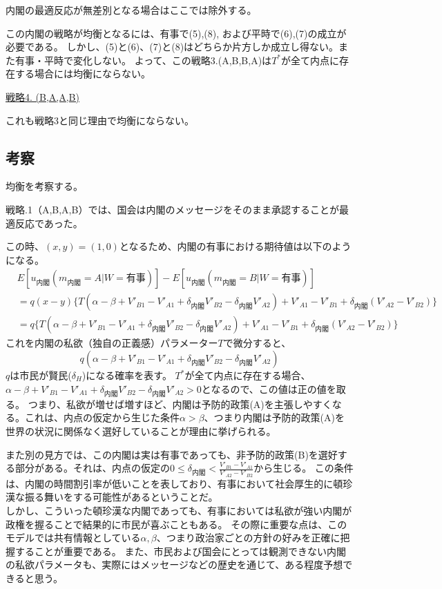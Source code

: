 \documentclass[main.tex]{subfiles}
\begin{document}
内閣の最適反応が無差別となる場合はここでは除外する。

この内閣の戦略が均衡となるには、有事で(5),(8), および平時で(6),(7)の成立が必要である。
しかし、(5)と(6)、(7)と(8)はどちらか片方しか成立し得ない。また有事・平時で変化しない。
よって、この戦略3.(A,B,B,A)は$T^*$が全て内点に存在する場合には均衡にならない。


\noindent
\underline{戦略4. (B,A,A,B)}

これも戦略3と同じ理由で均衡にならない。


\subsection{考察}
均衡を考察する。

戦略.1（A,B,A,B）では、国会は内閣のメッセージをそのまま承認することが最適反応であった。


この時、$(x, y) = (1,0)$となるため、内閣の有事における期待値は以下のようになる。
\begin{align*}
    &E[u_{内閣}(m_{内閣}=A|W=有事)] - E[u_{内閣}(m_{内閣}=B|W=有事)] \\
    &= q(x-y) \lbrace T(\alpha-\beta + V'_{B1}-V'_{A1} + \delta_{内閣}V'_{B2} - \delta_{内閣}V'_{A2}) + V'_{A1} - V'_{B1} + \delta_{内閣}(V'_{A2} - V'_{B2})  \rbrace\\
    &= q \lbrace T(\alpha-\beta + V'_{B1}-V'_{A1} + \delta_{内閣}V'_{B2} - \delta_{内閣}V'_{A2}) + V'_{A1} - V'_{B1} + \delta_{内閣}(V'_{A2} - V'_{B2})  \rbrace 
\end{align*}
これを内閣の私欲（独自の正義感）パラメーター$T$で微分すると、
$$ q(\alpha-\beta + V'_{B1}-V'_{A1} + \delta_{内閣}V'_{B2} - \delta_{内閣}V'_{A2}) $$
$q$は市民が賢民($\delta_H$)になる確率を表す。
$T^*$が全て内点に存在する場合、$\alpha-\beta + V'_{B1}-V'_{A1} + \delta_{内閣}V'_{B2} - \delta_{内閣}V'_{A2}>0$となるので、この値は正の値を取る。
つまり、私欲が増せば増すほど、内閣は予防的政策(A)を主張しやすくなる。これは、内点の仮定から生じた条件$\alpha>\beta$、つまり内閣は予防的政策(A)を世界の状況に関係なく選好していることが理由に挙げられる。

また別の見方では、この内閣は実は有事であっても、非予防的政策(B)を選好する部分がある。それは、内点の仮定の$0\le \delta_{内閣} < \frac{V'_{B1} - V'_{A1}}{V'_{A2} - V'_{B2}}$から生じる。
この条件は、内閣の時間割引率が低いことを表しており、有事において社会厚生的に頓珍漢な振る舞いをする可能性があるということだ。\\
しかし、こういった頓珍漢な内閣であっても、有事においては私欲が強い内閣が政権を握ることで結果的に市民が喜ぶこともある。
その際に重要な点は、このモデルでは共有情報としている$\alpha, \beta$、つまり政治家ごとの方針の好みを正確に把握することが重要である。
また、市民および国会にとっては観測できない内閣の私欲パラメータも、実際にはメッセージなどの歴史を通じて、ある程度予想できると思う。
\end{document}
